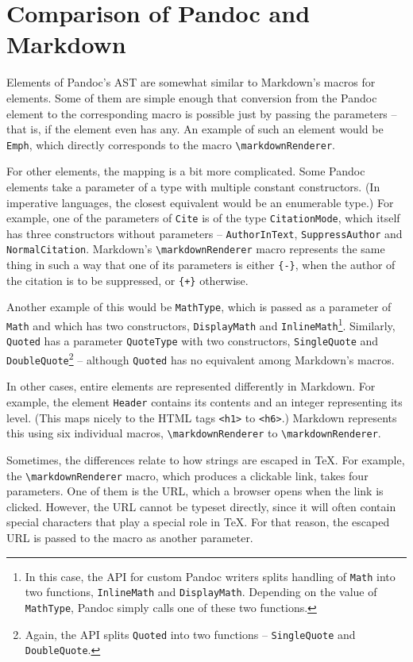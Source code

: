 \documentclass[
  digital,     %
  oneside,     %
  nosansbold,  %
  nocolorbold, %
  lof,         %
  nolot,       %
]{fithesis4}
\newcommand\macro[1]{\texttt{\textbackslash{}{#1}}}
\newcommand\renderer[1]{\macro{markdown\-Renderer\-{#1}}}
\begin{document}
\section{Comparison of Pandoc and Markdown}

Elements of Pandoc's AST are somewhat similar to Markdown's macros for elements. Some of them are simple enough that conversion from the Pandoc element to the corresponding macro is possible just by passing the parameters -- that is, if the element even has any. An example of such an element would be \texttt{Emph}, which directly corresponds to the macro \renderer{Emphasis}.

For other elements, the mapping is a bit more complicated. Some Pandoc elements take a parameter of a type with multiple constant constructors. (In imperative languages, the closest equivalent would be an enumerable type.) For example, one of the parameters of \texttt{Cite} is of the type \texttt{CitationMode}, which itself has three constructors without parameters -- \texttt{AuthorInText}, \texttt{SuppressAuthor} and \texttt{NormalCitation}. Markdown's \renderer{Cite} macro represents the same thing in such a way that one of its parameters is either \texttt{\{-\}}, when the author of the citation is to be suppressed, or \texttt{\{+\}} otherwise.

Another example of this would be \texttt{MathType}, which is passed as a parameter of \texttt{Math} and which has two constructors, \texttt{DisplayMath} and \texttt{InlineMath}\footnote{In this case, the API for custom Pandoc writers splits handling of \texttt{Math} into two functions, \texttt{InlineMath} and \texttt{DisplayMath}. Depending on the value of \texttt{MathType}, Pandoc simply calls one of these two functions.}. Similarly, \texttt{Quoted} has a parameter \texttt{QuoteType} with two constructors, \texttt{SingleQuote} and \texttt{DoubleQuote}\footnote{Again, the API splits \texttt{Quoted} into two functions -- \texttt{SingleQuote} and \texttt{DoubleQuote}.} -- although \texttt{Quoted} has no equivalent among Markdown's macros.

In other cases, entire elements are represented differently in Markdown. For example, the element \texttt{Header} contains its contents and an integer representing its level. (This maps nicely to the HTML tags \texttt{<h1>} to \texttt{<h6>}.) Markdown represents this using six individual macros, \renderer{HeadingOne} to \renderer{HeadingSix}.

Sometimes, the differences relate to how strings are escaped in \TeX{}. For example, the \renderer{Link} macro, which produces a clickable link, takes four parameters. One of them is the URL, which a browser opens when the link is clicked. However, the URL cannot be typeset directly, since it will often contain special characters that play a special role in \TeX{}. For that reason, the escaped URL is passed to the macro as another parameter.
\end{document}

